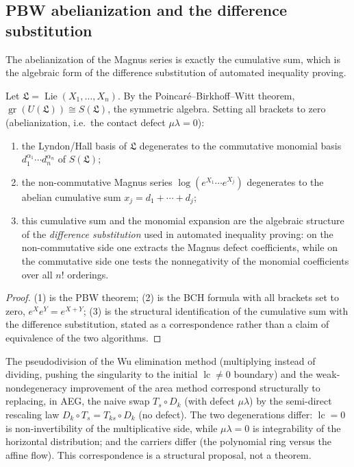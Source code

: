 \subsection{PBW abelianization and the difference substitution}

The abelianization of the Magnus series is exactly the cumulative sum, which is
the algebraic form of the difference substitution of automated inequality
proving.

\begin{theorem}
\label{thm:pbw-abelianization-difference-substitution}
Let $\mathfrak L=\operatorname{Lie}(X_1,\dots,X_n)$.  By the
Poincar\'e--Birkhoff--Witt theorem,
$\operatorname{gr}(U(\mathfrak L))\cong S(\mathfrak L)$, the symmetric algebra.
Setting all brackets to zero (abelianization, i.e.\ the contact defect
$\mu\lambda=0$):
\begin{enumerate}
  \item the Lyndon/Hall basis of $\mathfrak L$ degenerates to the commutative
  monomial basis $d_1^{\alpha_1}\cdots d_n^{\alpha_n}$ of $S(\mathfrak L)$;
  \item the non-commutative Magnus series $\log(e^{X_1}\cdots e^{X_j})$
  degenerates to the abelian cumulative sum $x_j=d_1+\cdots+d_j$;
  \item this cumulative sum and the monomial expansion are the algebraic
  structure of the \emph{difference substitution} used in automated inequality
  proving: on the non-commutative side one extracts the Magnus defect
  coefficients, while on the commutative side one tests the nonnegativity of the
  monomial coefficients over all $n!$ orderings.
\end{enumerate}
\end{theorem}

\begin{proof}
(1) is the PBW theorem; (2) is the BCH formula with all brackets set to zero,
$e^Xe^Y=e^{X+Y}$; (3) is the structural identification of the cumulative sum
with the difference substitution, stated as a correspondence rather than a
claim of equivalence of the two algorithms.
\end{proof}

\begin{remark}
\label{rem:wu-zhang-nondegeneracy-correspondence}
The pseudodivision of the Wu elimination method (multiplying instead of
dividing, pushing the singularity to the initial $\operatorname{lc}\ne0$
boundary) and the weak-nondegeneracy improvement of the area method correspond
structurally to replacing, in AEG, the naive swap $T_s\circ D_k$ (with defect
$\mu\lambda$) by the semi-direct rescaling law $D_k\circ T_s=T_{ks}\circ D_k$
(no defect).  The two degenerations differ: $\operatorname{lc}=0$ is
non-invertibility of the multiplicative side, while $\mu\lambda=0$ is
integrability of the horizontal distribution; and the carriers differ (the
polynomial ring versus the affine flow).  This correspondence is a structural
proposal, not a theorem.
\end{remark}
